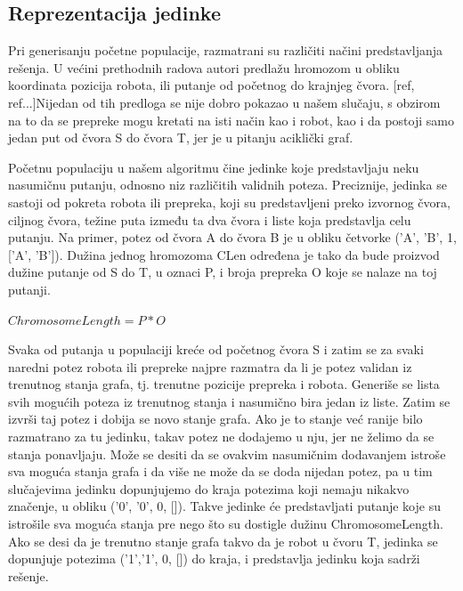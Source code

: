 \documentclass[12pt]{article}
\begin{document}
	\subsection{Reprezentacija jedinke}
	\label{subsec:podnaslov1}
	Pri generisanju početne populacije, razmatrani su različiti načini predstavljanja rešenja. U većini prethodnih radova autori predlažu hromozom u obliku koordinata pozicija robota, ili putanje od početnog do krajnjeg čvora. 
	[ref, ref...]Nijedan od tih predloga se nije dobro pokazao u našem slučaju, s obzirom na to da se prepreke mogu kretati na isti način kao i robot, kao i da postoji samo jedan put od čvora S do čvora T, jer je u pitanju aciklički graf.
	\par Početnu populaciju u našem algoritmu čine jedinke koje predstavljaju neku nasumičnu putanju, odnosno niz različitih validnih poteza. Preciznije, jedinka se sastoji od pokreta robota ili prepreka, koji su predstavljeni preko izvornog čvora, ciljnog čvora, težine puta između ta dva čvora i liste koja predstavlja celu putanju. Na primer, potez od čvora A do čvora B je u obliku četvorke ('A', 'B', 1, ['A', 'B']). Dužina jednog hromozoma CLen određena je tako da bude proizvod dužine putanje od S do T, u oznaci P, i broja prepreka O koje se nalaze na toj putanji. \newline
	
	$ ChromosomeLength =  P * O $  \newline
	
	\par Svaka od putanja u populaciji kreće od početnog čvora S i zatim se za svaki naredni potez robota ili prepreke najpre razmatra da li je potez validan iz trenutnog stanja grafa, tj. trenutne pozicije prepreka i robota. Generiše se lista svih mogućih poteza iz trenutnog stanja i nasumično bira jedan iz liste. Zatim se izvrši taj potez i dobija se novo stanje grafa. Ako je to stanje već ranije bilo razmatrano za tu jedinku, takav potez ne dodajemo u nju, jer ne želimo da se stanja ponavljaju. Može se desiti da se ovakvim nasumičnim dodavanjem istroše sva moguća stanja grafa i da više ne može da se doda nijedan potez, pa u tim slučajevima jedinku dopunjujemo do kraja potezima koji nemaju nikakvo značenje, u obliku ('0', '0', 0, []). Takve jedinke će predstavljati putanje koje su istrošile sva moguća stanja pre nego što su dostigle dužinu ChromosomeLength. Ako se desi da je trenutno stanje grafa takvo da je robot u čvoru T, jedinka se dopunjuje potezima ('1','1', 0, []) do kraja, i predstavlja jedinku koja sadrži rešenje.
	
\end{document}
